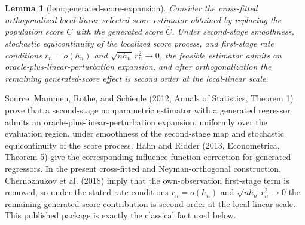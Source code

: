 \documentclass{article}
\newtheorem{lemma}{Lemma}
\begin{document}
\begin{lemma}[lem:generated-score-expansion]\label{lem:generated-score-expansion}
Consider the cross-fitted orthogonalized local-linear selected-score estimator obtained by replacing the population score \(C\) with the generated score \(\hat C\). Under second-stage smoothness, stochastic equicontinuity of the localized score process, and first-stage rate conditions \(r_n=o(h_n)\) and \(\sqrt{n h_n}\,r_n^2\to 0\), the feasible estimator admits an oracle-plus-linear-perturbation expansion, and after orthogonalization the remaining generated-score effect is second order at the local-linear scale.
\end{lemma}
Source. Mammen, Rothe, and Schienle (2012, Annals of Statistics, Theorem 1) prove that a second-stage nonparametric estimator with a generated regressor admits an oracle-plus-linear-perturbation expansion, uniformly over the evaluation region, under smoothness of the second-stage map and stochastic equicontinuity of the score process. Hahn and Ridder (2013, Econometrica, Theorem 5) give the corresponding influence-function correction for generated regressors. In the present cross-fitted and Neyman-orthogonal construction, Chernozhukov et al. (2018) imply that the own-observation first-stage term is removed, so under the stated rate conditions \(r_n=o(h_n)\) and \(\sqrt{n h_n}\,r_n^2\to 0\) the remaining generated-score contribution is second order at the local-linear scale. This published package is exactly the classical fact used below.
\end{document}

